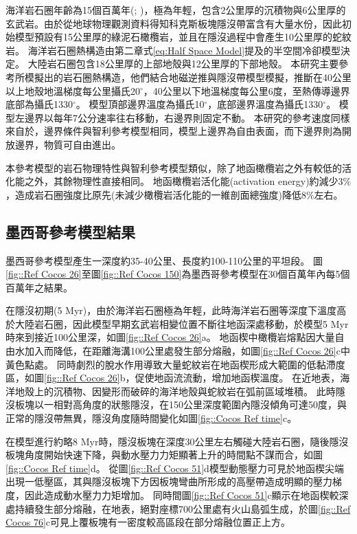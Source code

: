 海洋岩石圈年齡為15個百萬年(\citealp{Manea2011Thermal}; \citealp{muller2019})，極為年輕，包含2公里厚的沉積物與6公里厚的玄武岩。由於從地球物理觀測資料得知科克斯板塊隱沒帶富含有大量水份，因此初始模型預設有15公里厚的綠泥石橄欖岩，並且在隱沒過程中會產生10公里厚的蛇紋岩。
海洋岩石圈熱構造由第二章式\ref{eq:Half Space Model}提及的半空間冷卻模型決定。
大陸岩石圈包含18公里厚的上部地殼與12公里厚的下部地殼。
本研究主要參考\citealp{Manea2011Curie}所模擬出的岩石圈熱構造，他們結合地磁逆推與隱沒帶模型模擬，推斷在40公里以上地殼地溫梯度每公里攝氏20$^{\circ}$，40公里以下地溫梯度每公里6度，至熱傳導邊界底部為攝氏1330$^{\circ}$。
模型頂部邊界溫度為攝氏10$^{\circ}$，底部邊界溫度為攝氏1330$^{\circ}$。
模型左邊界以每年7公分速率往右移動，右邊界則固定不動。
本研究的參考速度同樣來自於\citealp{o2005uncertainties}，邊界條件與智利參考模型相同，模型上邊界為自由表面，而下邊界則為開放邊界，物質可自由進出。

本參考模型的岩石物理特性與智利參考模型類似，除了地函橄欖岩之外有較低的活化能之外，其餘物理性直接相同。
地函橄欖岩活化能(activation energy)約減少3$\%$，造成岩石圈強度比原先(未減少橄欖岩活化能的一維剖面總強度)降低8$\%$左右。


\subsection{墨西哥參考模型結果}\label{墨西哥參考模型結果}
墨西哥參考模型產生一深度約35-40公里、長度約100-110公里的平坦段。
圖\ref{fig::Ref Cocos 26}至圖\ref{fig::Ref Cocos 150}為墨西哥參考模型在30個百萬年內每5個百萬年之結果。

在隱沒初期(5 Myr)，由於海洋岩石圈極為年輕，此時海洋岩石圈等深度下溫度高於大陸岩石圈，因此模型早期玄武岩相變位置不斷往地函深處移動，於模型5 Myr時來到接近100公里深，如圖\ref{fig::Ref Cocos 26}a。
地函楔中橄欖岩熔點因大量自由水加入而降低，在距離海溝100公里處發生部分熔融，如圖\ref{fig::Ref Cocos 26}c中黃色點處。
同時劇烈的脫水作用導致大量蛇紋岩在地函楔形成大範圍的低黏滯度區，如圖\ref{fig::Ref Cocos 26}b，促使地函流流動，增加地函楔溫度。
在近地表，海洋地殼上的沉積物、因變形而破碎的海洋地殼與蛇紋岩在弧前區域堆積。
此時隱沒板塊以一相對高角度的狀態隱沒，在150公里深度範圍內隱沒傾角可達50度，與正常的隱沒帶無異，隱沒角度隨時間變化如圖\ref{fig::Cocos Ref time}c。

在模型進行約略8 Myr時，隱沒板塊在深度30公里左右觸碰大陸岩石圈，隨後隱沒板塊角度開始快速下降，與動水壓力力矩顯著上升的時間點不謀而合，如圖\ref{fig::Cocos Ref time}d。
從圖\ref{fig::Ref Cocos 51}d模型動態壓力可見於地函楔尖端出現一低壓區，其與隱沒板塊下方因板塊彎曲所形成的高壓帶造成明顯的壓力梯度，因此造成動水壓力力矩增加。
同時間圖\ref{fig::Ref Cocos 51}c顯示在地函楔較深處持續發生部分熔融，在地表，絕對座標700公里處有火山島弧生成，於圖\ref{fig::Ref Cocos 76}c可見上覆板塊有一密度較高區段在部分熔融位置正上方。

